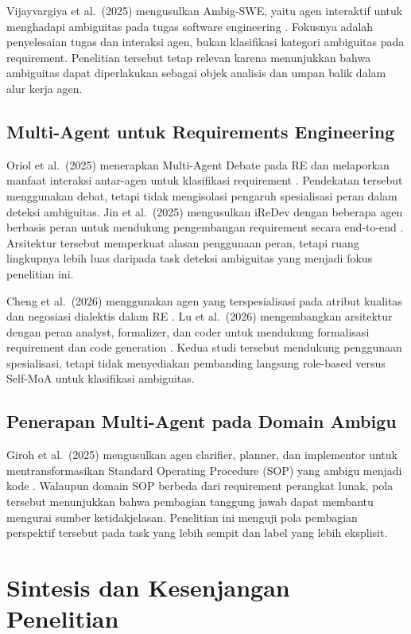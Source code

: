 Vijayvargiya et al.\ (2025) mengusulkan Ambig-SWE, yaitu agen interaktif untuk menghadapi ambiguitas pada tugas software engineering \cite{vijayvargiya2025}. Fokusnya adalah penyelesaian tugas dan interaksi agen, bukan klasifikasi kategori ambiguitas pada requirement. Penelitian tersebut tetap relevan karena menunjukkan bahwa ambiguitas dapat diperlakukan sebagai objek analisis dan umpan balik dalam alur kerja agen.

\subsection{Multi-Agent untuk Requirements Engineering}

Oriol et al.\ (2025) menerapkan Multi-Agent Debate pada RE dan melaporkan manfaat interaksi antar-agen untuk klasifikasi requirement \cite{oriol2025}. Pendekatan tersebut menggunakan debat, tetapi tidak mengisolasi pengaruh spesialisasi peran dalam deteksi ambiguitas. Jin et al.\ (2025) mengusulkan iReDev dengan beberapa agen berbasis peran untuk mendukung pengembangan requirement secara end-to-end \cite{jin2025}. Arsitektur tersebut memperkuat alasan penggunaan peran, tetapi ruang lingkupnya lebih luas daripada task deteksi ambiguitas yang menjadi fokus penelitian ini.

Cheng et al.\ (2026) menggunakan agen yang terspesialisasi pada atribut kualitas dan negosiasi dialektis dalam RE \cite{cheng2026}. Lu et al.\ (2026) mengembangkan arsitektur dengan peran analyst, formalizer, dan coder untuk mendukung formalisasi requirement dan code generation \cite{lu2026}. Kedua studi tersebut mendukung penggunaan spesialisasi, tetapi tidak menyediakan pembanding langsung role-based versus Self-MoA untuk klasifikasi ambiguitas.

\subsection{Penerapan Multi-Agent pada Domain Ambigu}

Giroh et al.\ (2025) mengusulkan agen clarifier, planner, dan implementor untuk mentransformasikan Standard Operating Procedure (SOP) yang ambigu menjadi kode \cite{giroh2025}. Walaupun domain SOP berbeda dari requirement perangkat lunak, pola tersebut menunjukkan bahwa pembagian tanggung jawab dapat membantu mengurai sumber ketidakjelasan. Penelitian ini menguji pola pembagian perspektif tersebut pada task yang lebih sempit dan label yang lebih eksplisit.

\section{Sintesis dan Kesenjangan Penelitian}

